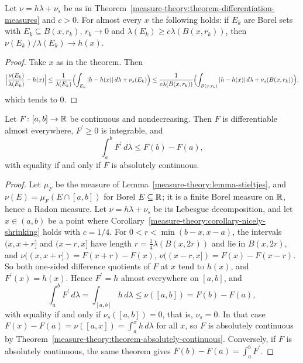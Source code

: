 \begin{corollary}\label{measure-theory:corollary-nicely-shrinking}
Let $\nu = h\lambda + \nu_s$ be as in Theorem~\ref{measure-theory:theorem-differentiation-measures} and $c > 0$. For almost every $x$ the following holds: if $E_k$ are Borel sets with
$E_k \subseteq B(x, r_k)$, $r_k \to 0$ and $\lambda(E_k) \geq c\lambda(B(x, r_k))$, then $\nu(E_k)/\lambda(E_k) \to h(x)$.
\end{corollary}

\begin{proof}
Take $x$ as in the theorem. Then
\[
\Bigl|\frac{\nu(E_k)}{\lambda(E_k)} - h(x)\Bigr| \leq \frac1{\lambda(E_k)}\Bigl(\int_{E_k}|h - h(x)|\,d\lambda + \nu_s(E_k)\Bigr) \leq \frac1{c\lambda(B(x, r_k))}\Bigl(\int_{B(x, r_k)}|h - h(x)|\,d\lambda + \nu_s(B(x, r_k))\Bigr),
\]
which tends to $0$.
\end{proof}

\begin{corollary}\label{measure-theory:corollary-monotone-differentiable}
Let $F \colon [a, b] \to \mathbb{R}$ be continuous and nondecreasing. Then $F$ is differentiable almost everywhere, $F^{\prime} \geq 0$ is integrable, and
\[
\int_a^bF^{\prime}\,d\lambda \leq F(b) - F(a),
\]
with equality if and only if $F$ is absolutely continuous.
\end{corollary}

\begin{proof}
Let $\mu_F$ be the measure of Lemma~\ref{measure-theory:lemma-stieltjes}, and $\nu(E) = \mu_F(E \cap [a, b])$ for Borel $E \subseteq \mathbb{R}$; it is a finite Borel measure on $\mathbb{R}$, hence a Radon measure. Let
$\nu = h\lambda + \nu_s$ be its Lebesgue decomposition, and let $x \in (a, b)$ be a point where Corollary~\ref{measure-theory:corollary-nicely-shrinking} holds with $c = 1/4$. For
$0 < r < \min(b - x, x - a)$, the intervals $(x, x + r]$ and $(x - r, x]$ have length $r = \frac14\lambda(B(x, 2r))$ and lie in $B(x, 2r)$, and
$\nu((x, x + r]) = F(x + r) - F(x)$, $\nu((x - r, x]) = F(x) - F(x - r)$. So both one-sided difference quotients of $F$ at $x$ tend to $h(x)$, and $F^{\prime}(x) = h(x)$. Hence $F^{\prime} = h$ almost
everywhere on $[a, b]$, and
\[
\int_a^bF^{\prime}\,d\lambda = \int_{[a, b]}h\,d\lambda \leq \nu([a, b]) = F(b) - F(a),
\]
with equality if and only if $\nu_s([a, b]) = 0$, that is, $\nu_s = 0$. In that case $F(x) - F(a) = \nu([a, x]) = \int_a^xh\,d\lambda$ for all $x$, so $F$ is absolutely continuous by
Theorem~\ref{measure-theory:theorem-absolutely-continuous}. Conversely, if $F$ is absolutely continuous, the same theorem gives $F(b) - F(a) = \int_a^bF^{\prime}$.
\end{proof}

